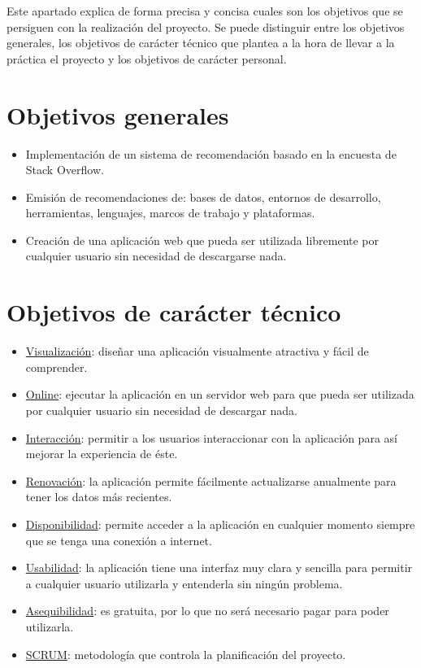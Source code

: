 
Este apartado explica de forma precisa y concisa cuales son los objetivos que se persiguen con la realización del proyecto. Se puede distinguir entre los objetivos generales, los objetivos de carácter técnico que plantea a la hora de llevar a la práctica el proyecto  y los objetivos de carácter personal.

\section{Objetivos generales}
\begin{itemize}
    \item Implementación de un sistema de recomendación basado en la encuesta de Stack Overflow.
    \item Emisión de recomendaciones de: bases de datos, entornos de desarrollo, herramientas, lenguajes, marcos de trabajo y plataformas.
    \item Creación de una aplicación web que pueda ser utilizada libremente por cualquier usuario sin necesidad de descargarse nada.
\end{itemize}

\section{Objetivos de carácter técnico}
\begin{itemize}
    \item \underline{Visualización}: diseñar una aplicación visualmente atractiva y fácil de comprender.  
    \item \underline{Online}: ejecutar la aplicación en un servidor web para que pueda ser utilizada por cualquier usuario sin necesidad de descargar nada.
    \item \underline{Interacción}: permitir a los usuarios interaccionar con la aplicación para así mejorar la experiencia de éste.
    \item \underline{Renovación}: la aplicación permite fácilmente actualizarse anualmente para tener los datos más recientes.
    \item \underline{Disponibilidad}: permite acceder a la aplicación en cualquier momento siempre que se tenga una conexión a internet.
    \item \underline{Usabilidad}: la aplicación tiene una interfaz muy clara y sencilla para permitir a cualquier usuario utilizarla y entenderla sin ningún problema.
    \item \underline{Asequibilidad}: es gratuita, por lo que no será necesario pagar para poder utilizarla.
    \item \underline{SCRUM}: metodología que controla la planificación del proyecto.
\end{itemize}

